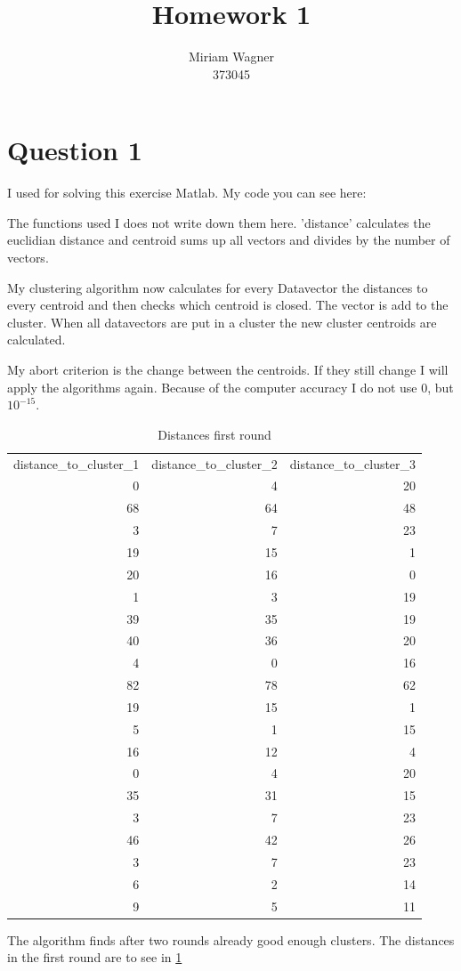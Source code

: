 \documentclass{article}
\title{Homework 1}
\author{ Miriam Wagner\\373045}
\begin{document}
\maketitle
\section*{Question 1}
I used for solving this exercise Matlab. My code you can see here:


The functions used I does not write down them here. 'distance' calculates the
euclidian distance and centroid sums up all vectors and divides by the number of
vectors.

My clustering algorithm now calculates for every Datavector the distances to
every centroid and then checks which centroid is closed. The vector is add to
the cluster. When all datavectors are put in a cluster the new cluster centroids
are calculated. 

My abort criterion is the change between the centroids. If they still change I
will apply the algorithms again. Because of the computer accuracy I do not use
0, but $10^{-15}$.
\begin{table}[h]
  \centering
  \caption{Distances first round}
    \begin{tabular}{rrr}
    \multicolumn{1}{l}{distance\_to\_cluster\_1} & \multicolumn{1}{l}{distance\_to\_cluster\_2} & \multicolumn{1}{l}{distance\_to\_cluster\_3} \\
    0     & 4     & 20 \\
    68    & 64    & 48 \\
    3     & 7     & 23 \\
    19    & 15    & 1 \\
    20    & 16    & 0 \\
    1     & 3     & 19 \\
    39    & 35    & 19 \\
    40    & 36    & 20 \\
    4     & 0     & 16 \\
    82    & 78    & 62 \\
    19    & 15    & 1 \\
    5     & 1     & 15 \\
    16    & 12    & 4 \\
    0     & 4     & 20 \\
    35    & 31    & 15 \\
    3     & 7     & 23 \\
    46    & 42    & 26 \\
    3     & 7     & 23 \\
    6     & 2     & 14 \\
    9     & 5     & 11 \\
    \end{tabular}%
  \label{tab:dist1}%
\end{table}%
The algorithm finds after two rounds already good enough clusters.
The distances in the first round are to see in \ref{tab:dist1}
\end{document}
